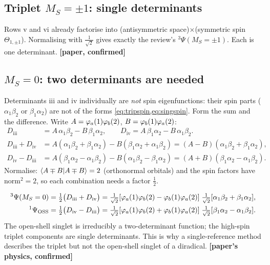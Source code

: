 \subsection{Triplet $M_S=\pm1$: single determinants}
Rows v and vi already factorise into (antisymmetric space)$\times$(symmetric spin $\Theta_{1,\pm1}$).
Normalising with $\tfrac1{\sqrt2}$ gives exactly the review's $^3\Psi(M_S=\pm1)$. Each is one determinant.
\textbf{[paper, confirmed]}

\subsection{$M_S=0$: two determinants are needed}
Determinants iii and iv individually are \emph{not} spin eigenfunctions: their spin parts
($\alpha_1\beta_2$ or $\beta_1\alpha_2$) are not of the forms \cref{eq:tripspin,eq:singspin}. Form the
sum and the difference. Write $A=\varphi_a(1)\varphi_b(2)$, $B=\varphi_b(1)\varphi_a(2)$:
\begin{align}
  D_{\text{iii}}&=A\,\alpha_1\beta_2-B\,\beta_1\alpha_2, \qquad
  D_{\text{iv}}=A\,\beta_1\alpha_2-B\,\alpha_1\beta_2.\\
  D_{\text{iii}}+D_{\text{iv}}&=A(\alpha_1\beta_2+\beta_1\alpha_2)-B(\beta_1\alpha_2+\alpha_1\beta_2)
     =(A-B)(\alpha_1\beta_2+\beta_1\alpha_2),\label{eq:sum}\\
  D_{\text{iv}}-D_{\text{iii}}&=A(\beta_1\alpha_2-\alpha_1\beta_2)-B(\alpha_1\beta_2-\beta_1\alpha_2)
     =(A+B)(\beta_1\alpha_2-\alpha_1\beta_2).\label{eq:diff}
\end{align}
Normalise: $\langle A\mp B\vert A\mp B\rangle=2$ (orthonormal orbitals) and the spin factors have norm$^2=2$,
so each combination needs a factor $\tfrac12$.

\begin{resultbox}
\vspace{-1.2em}
\begin{align}
  ^3\Psi(M_S=0)&=\tfrac12\bigl(D_{\text{iii}}+D_{\text{iv}}\bigr)
     =\tfrac1{\sqrt2}[\varphi_a(1)\varphi_b(2)-\varphi_b(1)\varphi_a(2)]\;\tfrac1{\sqrt2}[\alpha_1\beta_2+\beta_1\alpha_2],\label{eq:T0}\\
  ^1\Psi_{\text{OSS}}&=\tfrac12\bigl(D_{\text{iv}}-D_{\text{iii}}\bigr)
     =\tfrac1{\sqrt2}[\varphi_a(1)\varphi_b(2)+\varphi_b(1)\varphi_a(2)]\;\tfrac1{\sqrt2}[\beta_1\alpha_2-\alpha_1\beta_2].\label{eq:OSS}
\end{align}
The open-shell singlet is irreducibly a two-determinant function; the high-spin triplet components are
single determinants. This is why a single-reference method describes the triplet but not the
open-shell singlet of a diradical. \textbf{[paper's physics, confirmed]}
\end{resultbox}

